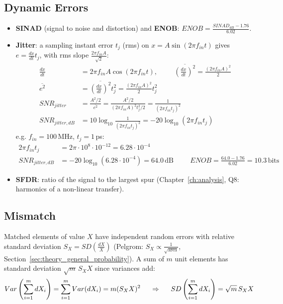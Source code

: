 \subsection{Dynamic Errors}
\begin{itemize}
  \item \textbf{SINAD} (signal to noise and distortion) and
    \textbf{ENOB}: \(ENOB = \frac{SINAD_{dB} - 1.76}{6.02}\).
  \item \textbf{Jitter}: a sampling instant error \(t_j\) (rms) on
    \(x = A\sin(2\pi f_{in} t)\) gives \(e = \frac{dx}{dt} t_j\), with rms slope
    \(\frac{2\pi f_{in} A}{\sqrt{2}}\):
    \begin{align*}
      \frac{dx}{dt} &= 2\pi f_{in} A \cos(2\pi f_{in} t), \hspace{1cm}
      \overline{\left(\frac{dx}{dt}\right)^2} = \frac{(2\pi f_{in} A)^2}{2} \\
      \overline{e^2} &= \overline{\left(\frac{dx}{dt}\right)^2} t_j^2 = \frac{(2\pi f_{in} A)^2}{2} t_j^2 \\
      SNR_{jitter} &= \frac{A^2/2}{\overline{e^2}} = \frac{A^2/2}{(2\pi f_{in} A)^2 t_j^2 / 2} = \frac{1}{(2\pi f_{in} t_j)^2} \\
      SNR_{jitter,dB} &= 10\log_{10}\frac{1}{(2\pi f_{in} t_j)^2} = -20\log_{10}(2\pi f_{in} t_j)
    \end{align*}
    e.g. \(f_{in} = 100\,\)MHz, \(t_j = 1\,\)ps:
    \begin{align*}
      2\pi f_{in} t_j &= 2\pi \cdot 10^{8} \cdot 10^{-12} = 6.28 \cdot 10^{-4} \\
      SNR_{jitter,dB} &= -20\log_{10}\left(6.28 \cdot 10^{-4}\right) = 64.0\,\text{dB} \hspace{1cm}
      ENOB = \frac{64.0 - 1.76}{6.02} = 10.3\,\text{bits}
    \end{align*}
  \item \textbf{SFDR}: ratio of the signal to the largest spur
    (Chapter~\ref{ch:analysis}, Q8: harmonics of a non-linear transfer).
\end{itemize}

\subsection{Mismatch}
Matched elements of value \(X\) have independent random errors with
relative standard deviation \(S_X = SD\left(\frac{dX}{X}\right)\) (Pelgrom:
\(S_X \propto \frac{1}{\sqrt{\text{area}}}\), Section~\ref{sec:theory_general_probability}).
A sum of \(m\) unit elements has standard deviation \(\sqrt{m}\, S_X X\) since
variances add:
\[
  Var\left(\sum_{i=1}^{m} dX_i\right) = \sum_{i=1}^{m} Var(dX_i) = m (S_X X)^2
  \hspace{0.5cm} \Rightarrow \hspace{0.5cm}
  SD\left(\sum_{i=1}^{m} dX_i\right) = \sqrt{m}\, S_X X
\]
